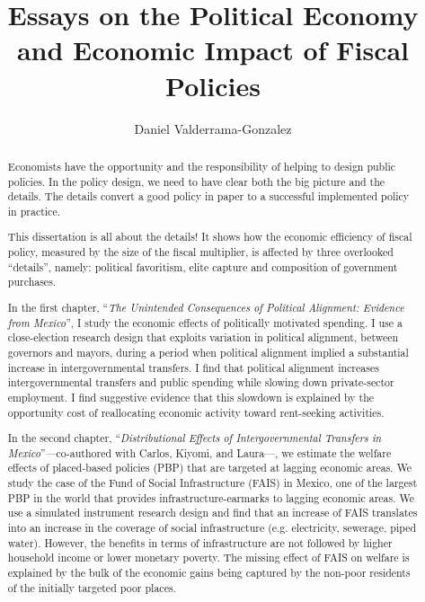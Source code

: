 \documentclass[12pt]{report}
\title{Essays on the Political Economy and Economic Impact of Fiscal Policies}
\author{Daniel Valderrama-Gonzalez}
\begin{document}

\maketitle   

\begin{abstract}

Economists have the opportunity and the responsibility of helping to design public policies. In the policy design, we need to have clear both the big picture and the details. The details convert a good policy in paper to a successful implemented policy in practice. 

This dissertation is all about the details! It shows how the economic efficiency of fiscal policy, measured by the size of the fiscal multiplier, is affected by three overlooked \enquote{details}, namely: political favoritism, elite capture and composition of government purchases. 

In the first chapter, \enquote{\textit{The Unintended Consequences of Political Alignment: Evidence from Mexico}}, I study the economic effects of politically motivated spending. I use a close-election research design that exploits variation in political alignment, between governors and mayors, during a period when political alignment implied a substantial increase in intergovernmental transfers. I find that political alignment increases intergovernmental transfers and public spending while slowing down private-sector employment. I find suggestive evidence that this slowdown is explained by the opportunity cost of reallocating economic activity toward rent-seeking activities. 

In the second chapter, \enquote{\textit{Distributional Effects of Intergovernmental Transfers in Mexico}}---co-authored with Carlos, Kiyomi, and Laura---,
we estimate the welfare effects of placed-based policies (PBP) that are targeted at lagging economic areas. We study the case of the Fund of Social Infrastructure (FAIS) in Mexico, one of the largest PBP in the world that provides infrastructure-earmarks to lagging economic areas. We use a simulated instrument research design and find that an increase of FAIS translates into an increase in the coverage of social infrastructure (e.g. electricity, sewerage, piped water). However, the benefits in terms of infrastructure are not followed by higher household income or lower monetary poverty. The missing effect of FAIS on welfare is explained by the bulk of the economic gains being captured by the non-poor residents of the initially targeted poor places.


\end{abstract}
\end{document}
